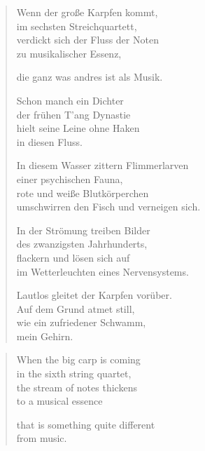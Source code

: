 
{\setlength{\stanzaskip}{0.6em}

\cleartoverso


\vspace*{-0.3em}
\begin{verse}

Wenn der große Karpfen kommt,\\
im sechsten Streichquartett,\\
verdickt sich der Fluss der Noten\\
zu musikalischer Essenz,

die ganz was andres ist als Musik.

Schon manch ein Dichter\\
der frühen T'ang Dynastie\\
hielt seine Leine ohne Haken\\
in diesen Fluss.

In diesem Wasser zittern Flimmerlarven\\
einer psychischen Fauna,\\
rote und weiße Blutkörperchen\\
umschwirren den Fisch und verneigen sich.

In der Strömung treiben Bilder\\
des zwanzigsten Jahrhunderts,\\
flackern und lösen sich auf\\
im Wetterleuchten eines Nervensystems.

Lautlos gleitet der Karpfen vorüber.\\
Auf dem Grund atmet still,\\
wie ein zufriedener Schwamm,\\
mein Gehirn.

\end{verse}

\clearpage


\vspace*{-0.3em}
\begin{verse}

When the big carp is coming\\
in the sixth string quartet,\\
the stream of notes thickens\\
to a musical essence

that is something quite different\\
from music.


\end{verse}}
